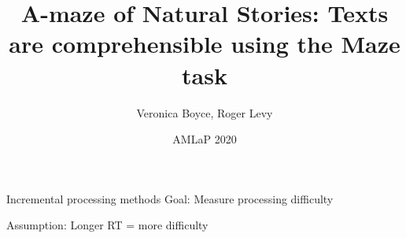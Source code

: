 \documentclass[12pt, xcolor=beamer,table,usenames,dvipsnames, ignorenonframetext, ngerman]{beamer}
\title{A-maze of Natural Stories: Texts are comprehensible using the Maze task}
\author{Veronica Boyce, Roger Levy}
\date{AMLaP 2020}
\begin{document}
\begin{frame}
\maketitle
\end{frame}



\begin{frame}{Incremental processing methods}
\pause
Goal: Measure processing difficulty

Assumption: Longer RT = more difficulty
\medskip

\pause
\end{frame}
\end{document}
